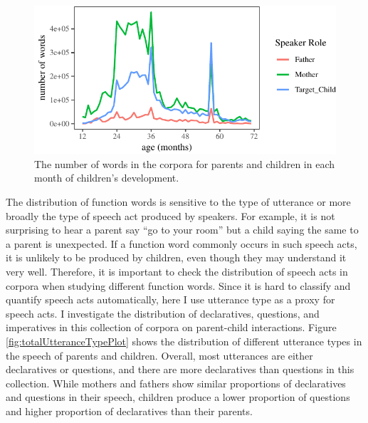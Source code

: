 \documentclass[floatsintext,man]{apa6}
\theoremstyle{definition}
\theoremstyle{definition}
\theoremstyle{definition}
\theoremstyle{remark}
\begin{document}
\begin{figure}[tb]

{\centering \includegraphics{figs/wordsByAge-1} 

}

\caption{The number of words in the corpora for parents and children in each month of children's development.}\label{fig:wordsByAge}
\end{figure}

The distribution of function words is sensitive to the type of utterance
or more broadly the type of speech act produced by speakers. For
example, it is not surprising to hear a parent say \enquote{go to your
room} but a child saying the same to a parent is unexpected. If a
function word commonly occurs in such speech acts, it is unlikely to be
produced by children, even though they may understand it very well.
Therefore, it is important to check the distribution of speech acts in
corpora when studying different function words. Since it is hard to
classify and quantify speech acts automatically, here I use utterance
type as a proxy for speech acts. I investigate the distribution of
declaratives, questions, and imperatives in this collection of corpora
on parent-child interactions. Figure \ref{fig:totalUtteranceTypePlot}
shows the distribution of different utterance types in the speech of
parents and children. Overall, most utterances are either declaratives
or questions, and there are more declaratives than questions in this
collection. While mothers and fathers show similar proportions of
declaratives and questions in their speech, children produce a lower
proportion of questions and higher proportion of declaratives than their
parents.
\end{document}
